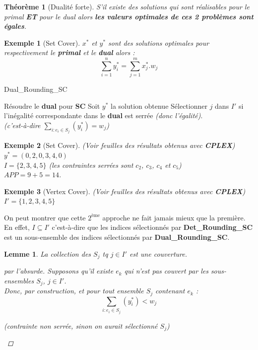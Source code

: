 \documentclass{article}
\newcommand{\titre}[1]{\textcolor{title}{#1}}
\newtheorem{exemple}{Exemple}[section]
\newtheorem{thm}{Th\'eor\`eme}[section]
\newtheorem{lemme}{Lemme}[section]
\newtheorem{proof}{Preuve}[section]
\begin{document}
\begin{sffamily}
\begin{thm}[\titre{Dualité forte}] S'il existe des solutions qui sont
réalisables pour le primal \textbf{ET} pour le dual alors \textbf{les valeurs
optimales de ces 2 problèmes sont égales}.
\end{thm}

\begin{exemple}[Set Cover]
$x^*$ et $y^*$ sont des solutions optimales pour respectivement le
\textbf{primal} et le \textbf{dual} alors :
$$ \sum_{i=1}^n y^*_i = \sum_{j=1}^m x^*_j.w_j$$
\end{exemple}

\begin{algorithm}[h!]
\caption{Dual\_Rounding\_SC}
\begin{algorithmic}[1]
\STATE Résoudre le \textbf{dual} pour \textbf{\titre{SC}}
\STATE Soit $y^*$ la solution obtenue
\STATE Sélectionner $j$ dans $I'$ si l'inégalité correspondante dans le
\textbf{dual} est serrée \textit{(donc l'égalité)}.\\
\textit{(c'est-à-dire $\sum_{i : e_i \in S_j} (y^*_i) = w_j$)}
\end{algorithmic}
\end{algorithm}

\begin{exemple}[Set Cover] (Voir feuilles des résultats obtenus avec
\textbf{CPLEX}) \\
$y^* = (0,2,0,3,4,0)$ \\
$I = \{2,3,4,5\}$ (les contraintes serrées sont $c_2$, $c_3$, $c_4$ et $c_5$)\\
$APP=9+5=14$.
\end{exemple}

\begin{exemple}[Vertex Cover] (Voir feuilles des résultats obtenus avec
\textbf{CPLEX}) \\
$I' = \{1,2,3,4,5\}$
\end{exemple}

On peut montrer que cette $2^{\text{ème}}$ approche ne fait jamais mieux que la
première. En effet, $I \subseteq I'$ c'est-à-dire que les indices sélectionnés
par \textbf{Det\_Rounding\_SC} est un sous-ensemble des indices sélectionnés par
\textbf{Dual\_Rounding\_SC}.

\begin{lemme}
La collection des $S_j$ tq $j\in I'$ est une couverture.$ $\\
\begin{proof}[par l'absurde]
Supposons qu'il existe $e_k$ qui n'est pas couvert par les sous-ensembles $S_j$,
$j\in I'$.\\
Donc, par construction, et pour tout ensemble $S_j$ contenant $e_k$ :
$$\sum_{i : e_i \in S_j}(y^*_i) < w_j $$
\begin{center}
\textit{(contrainte non serrée, sinon on aurait sélectionné $S_j$)}
\end{center}


\end{proof}
\end{lemme}
\end{sffamily}
\end{document}
